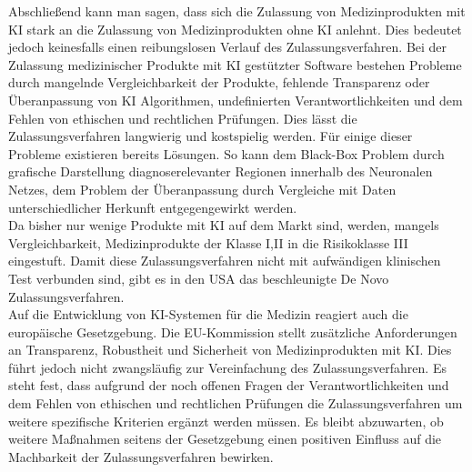 Abschließend kann man sagen, dass sich die Zulassung von Medizinprodukten mit KI stark an die Zulassung von Medizinprodukten ohne KI anlehnt. Dies bedeutet jedoch keinesfalls einen reibungslosen Verlauf des Zulassungsverfahren. 
Bei der Zulassung medizinischer Produkte mit KI gestützter Software bestehen Probleme durch mangelnde Vergleichbarkeit der Produkte, fehlende Transparenz oder Überanpassung von KI Algorithmen, undefinierten Verantwortlichkeiten und dem Fehlen von ethischen und rechtlichen Prüfungen. Dies lässt die Zulassungsverfahren langwierig und kostspielig werden.
Für einige dieser Probleme existieren bereits Lösungen. So kann dem Black-Box Problem durch grafische Darstellung diagnoserelevanter Regionen innerhalb des Neuronalen Netzes, dem Problem der Überanpassung durch Vergleiche mit Daten unterschiedlicher Herkunft entgegengewirkt werden.\\ 
Da bisher nur wenige Produkte mit KI auf dem Markt sind, werden, mangels Vergleichbarkeit, Medizinprodukte der Klasse I,II in die Risikoklasse III eingestuft. Damit diese Zulassungsverfahren nicht mit aufwändigen klinischen Test verbunden sind, gibt es in den USA das beschleunigte De Novo Zulassungsverfahren.\\
Auf die Entwicklung von KI-Systemen für die Medizin reagiert auch die europäische Gesetzgebung. Die EU-Kommission stellt zusätzliche Anforderungen an Transparenz, Robustheit und Sicherheit von Medizinprodukten mit KI. Dies führt jedoch nicht zwangsläufig zur Vereinfachung des Zulassungsverfahren. 
Es steht fest, dass aufgrund der noch offenen Fragen der  Verantwortlichkeiten und dem Fehlen von ethischen und rechtlichen Prüfungen die Zulassungsverfahren um weitere spezifische Kriterien ergänzt werden müssen. 
Es bleibt abzuwarten, ob weitere Maßnahmen seitens der Gesetzgebung einen positiven Einfluss auf die Machbarkeit der Zulassungsverfahren bewirken.


